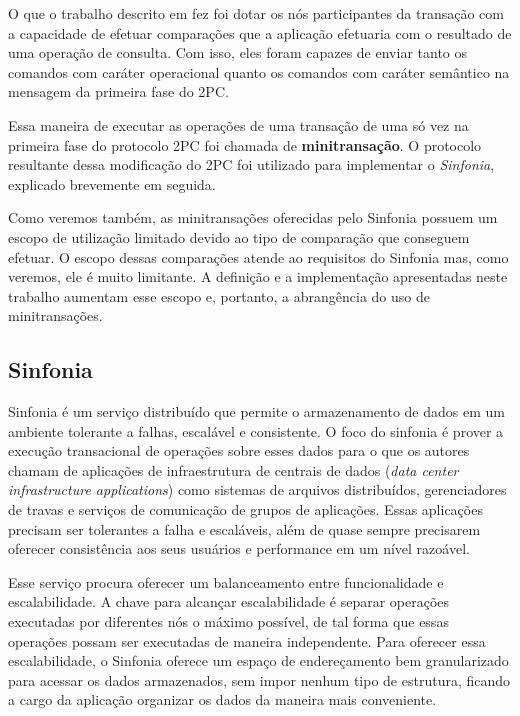 \documentclass[11pt,twoside,a4paper]{book}
\begin{document}

O que o trabalho descrito em \cite{sinfonia} fez foi dotar os nós participantes da transação com a capacidade de efetuar comparações que a aplicação efetuaria com o resultado de uma operação de consulta. Com isso, eles foram capazes de enviar tanto os comandos com caráter operacional quanto os comandos com caráter semântico na mensagem da primeira fase do 2PC.

Essa maneira de executar as operações de uma transação de uma só vez na primeira fase do protocolo 2PC foi chamada de \textbf{minitransação}. O protocolo resultante dessa modificação do 2PC foi utilizado para implementar o \emph{Sinfonia}, explicado brevemente em seguida.

Como veremos também, as minitransações oferecidas pelo Sinfonia possuem um escopo de utilização limitado devido ao tipo de comparação que conseguem efetuar. O escopo dessas comparações atende ao requisitos do Sinfonia mas, como veremos, ele é muito limitante. A definição e a implementação apresentadas neste trabalho aumentam esse escopo e, portanto, a abrangência do uso de minitransações.

\subsection{Sinfonia}
Sinfonia é um serviço distribuído que permite o armazenamento de dados em um ambiente tolerante a falhas, escalável e consistente. O foco do sinfonia é prover a execução transacional de operações sobre esses dados para o que os autores chamam de aplicações de infraestrutura de centrais de dados (\emph{data center infrastructure applications}) como sistemas de arquivos distribuídos, gerenciadores de travas e serviços de comunicação de grupos de aplicações. Essas aplicações precisam ser tolerantes a falha e escaláveis, além de quase sempre precisarem oferecer consistência aos seus usuários e performance em um nível razoável.

Esse serviço procura oferecer um balanceamento entre funcionalidade e escalabilidade. A chave para alcançar escalabilidade é separar operações executadas por diferentes nós o máximo possível, de tal forma que essas operações possam ser executadas de maneira independente. Para oferecer essa escalabilidade, o Sinfonia oferece um espaço de endereçamento bem granularizado para acessar os dados armazenados, sem impor nenhum tipo de estrutura, ficando a cargo da aplicação organizar os dados da maneira mais conveniente.
\end{document}
